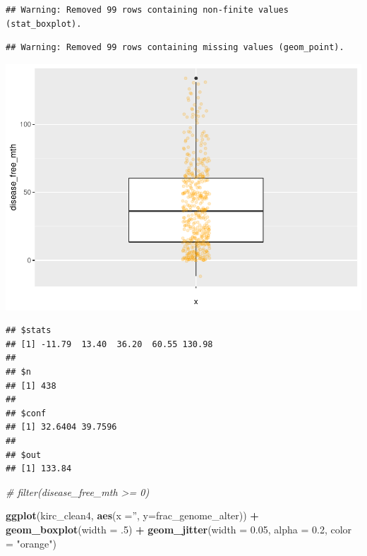 \documentclass[]{article}
\newenvironment{Shaded}{\begin{snugshade}}{\end{snugshade}}
\newcommand{\KeywordTok}[1]{\textcolor[rgb]{0.13,0.29,0.53}{\textbf{#1}}}
\newcommand{\DataTypeTok}[1]{\textcolor[rgb]{0.13,0.29,0.53}{#1}}
\newcommand{\DecValTok}[1]{\textcolor[rgb]{0.00,0.00,0.81}{#1}}
\newcommand{\FloatTok}[1]{\textcolor[rgb]{0.00,0.00,0.81}{#1}}
\newcommand{\StringTok}[1]{\textcolor[rgb]{0.31,0.60,0.02}{#1}}
\newcommand{\CommentTok}[1]{\textcolor[rgb]{0.56,0.35,0.01}{\textit{#1}}}
\newcommand{\OperatorTok}[1]{\textcolor[rgb]{0.81,0.36,0.00}{\textbf{#1}}}
\newcommand{\NormalTok}[1]{#1}
\begin{document}
\begin{verbatim}
## Warning: Removed 99 rows containing non-finite values (stat_boxplot).
\end{verbatim}

\begin{verbatim}
## Warning: Removed 99 rows containing missing values (geom_point).
\end{verbatim}

\includegraphics{figs/render-unnamed-chunk-20-1.pdf}

\begin{Shaded}
\end{Shaded}

\begin{verbatim}
## $stats
## [1] -11.79  13.40  36.20  60.55 130.98
## 
## $n
## [1] 438
## 
## $conf
## [1] 32.6404 39.7596
## 
## $out
## [1] 133.84
\end{verbatim}

\begin{Shaded}
\begin{Highlighting}[]
\CommentTok{# filter(disease_free_mth >= 0) }
\end{Highlighting}
\end{Shaded}

\begin{Shaded}
\begin{Highlighting}[]
\KeywordTok{ggplot}\NormalTok{(kirc_clean4, }\KeywordTok{aes}\NormalTok{(}\DataTypeTok{x =}\StringTok{''}\NormalTok{, }\DataTypeTok{y=}\NormalTok{frac_genome_alter)) }\OperatorTok{+}
\StringTok{     }\KeywordTok{geom_boxplot}\NormalTok{(}\DataTypeTok{width =}\NormalTok{ .}\DecValTok{5}\NormalTok{) }\OperatorTok{+}
\StringTok{     }\KeywordTok{geom_jitter}\NormalTok{(}\DataTypeTok{width =} \FloatTok{0.05}\NormalTok{, }\DataTypeTok{alpha =} \FloatTok{0.2}\NormalTok{, }\DataTypeTok{color =} \StringTok{"orange"}\NormalTok{)}
\end{Highlighting}
\end{Shaded}
\end{document}

